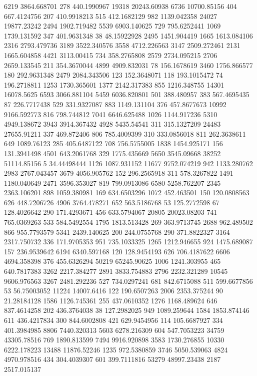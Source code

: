 6219	3864.668701
278	440.1990967
19318	20243.60938
6736	10700.85156
404	667.4124756
207	410.9918213
515	412.1682129
982	1139.042358
24027	19877.23242
2494	1902.719482
5539	6903.140625
729	795.6252441
1069	1739.131592
347	401.9631348
38	48.15922928
2495	1451.904419
1665	1613.084106
2316	2793.479736
3189	3522.340576
3558	4712.226563
3147	2509.272461
2131	1665.604858
4421	3113.00415
734	358.2765808
2579	2734.095215
2706	2659.133545
211	354.3670044
4899	4909.832031
78	156.1678619
3460	1756.866577
180	292.9631348
2479	2084.343506
123	152.3648071
118	193.1015472
74	196.2718811
1253	1730.365601
1377	2142.317383
855	1216.348755
14301	16078.5625
6593	3066.881104
5459	6036.820801
501	388.480957
383	567.4695435
87	226.7717438
529	331.9327087
883	1149.131104
376	457.8677673
10992	9166.592773
816	798.744812
7041	6646.625488
1026	1144.917236
5310	4949.138672
3943	3914.367432
4928	5435.54541
311	315.1327209
24483	27655.91211
337	469.872406
806	785.4009399
310	333.0856018
811	262.3638611
649	1089.76123
285	405.6487122
708	756.5755005
1838	1454.925171
156	131.3941498
4501	643.2061768
329	1775.435669
5650	3545.09668
38252	51114.85156
5	34.44498444
1126	1087.931152
11677	9752.074219
942	1133.280762
2983	2767.043457
3679	4056.905762
152	296.2565918
311	578.3267822
1491	1180.040649
2471	3596.353027
819	799.0913086
6580	5258.762207
2345	2363.106201
898	1059.380981
169	634.6503296
1072	452.463501
150	120.0808563
626	448.7206726
4906	3764.478271
652	563.5186768
53	125.2772598
67	128.4026642
290	171.4293671
456	633.5794067
20805	20023.08203
741	765.0369263
533	584.5492554
1795	1813.513428
269	363.9713745
2688	962.489502
866	955.7793579
5341	2439.140625
200	244.0755768
290	371.8822327
3164	2317.750732
336	171.9705353
951	735.1033325
1265	1212.946655
924	1475.689087
157	236.9539642
6194	6340.597168
120	128.9454193
626	706.4187622
6606	4694.358398
376	455.6326294
50219	65245.90625
1006	1241.303955
465	640.7817383
3262	2217.384277
2891	3833.754883
2796	2232.321289
10545	9606.976563
3267	2481.292236
527	734.0297241
681	842.6715088
511	599.6677856
53	56.75003052
11224	14007.6416
122	190.6507263
2006	2353.375244
90	21.28184128
1586	1126.745361
255	437.0610352
1276	1168.489624
646	837.4614258
202	436.3764038
38	127.2982025
949	1089.259644
1584	1853.874146
611	436.4217834
300	844.6002808
421	629.9454956
114	105.6687927
334	401.3984985
8806	7440.320313
5603	6278.216309
604	547.7053223
34759	43305.78516
769	1890.813599
7494	9916.920898
3583	1730.276855
10330	6222.178223
13488	11876.52246
1235	972.5380859
3746	5050.539063
4824	4970.978516
434	304.4039307
601	399.7111816
53279	48997.23438
2187	2517.015137
